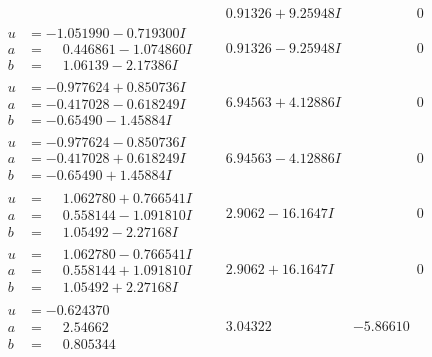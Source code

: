 \documentclass[1p]{elsarticle_modified}
\theoremstyle{definition}
\begin{document}
$$\begin{array}{c|c|c}
 & \phantom{-}0.91326 + 9.25948 I & \phantom{-0.000000 } 0 \\ \hline\begin{aligned}
u &= -1.051990 - 0.719300 I \\
a &= \phantom{-}0.446861 - 1.074860 I \\
b &= \phantom{-}1.06139 - 2.17386 I\end{aligned}
 & \phantom{-}0.91326 - 9.25948 I & \phantom{-0.000000 } 0 \\ \hline\begin{aligned}
u &= -0.977624 + 0.850736 I \\
a &= -0.417028 - 0.618249 I \\
b &= -0.65490 - 1.45884 I\end{aligned}
 & \phantom{-}6.94563 + 4.12886 I & \phantom{-0.000000 } 0 \\ \hline\begin{aligned}
u &= -0.977624 - 0.850736 I \\
a &= -0.417028 + 0.618249 I \\
b &= -0.65490 + 1.45884 I\end{aligned}
 & \phantom{-}6.94563 - 4.12886 I & \phantom{-0.000000 } 0 \\ \hline\begin{aligned}
u &= \phantom{-}1.062780 + 0.766541 I \\
a &= \phantom{-}0.558144 - 1.091810 I \\
b &= \phantom{-}1.05492 - 2.27168 I\end{aligned}
 & \phantom{-}2.9062 - 16.1647 I & \phantom{-0.000000 } 0 \\ \hline\begin{aligned}
u &= \phantom{-}1.062780 - 0.766541 I \\
a &= \phantom{-}0.558144 + 1.091810 I \\
b &= \phantom{-}1.05492 + 2.27168 I\end{aligned}
 & \phantom{-}2.9062 + 16.1647 I & \phantom{-0.000000 } 0 \\ \hline\begin{aligned}
u &= -0.624370\phantom{ +0.000000I} \\
a &= \phantom{-}2.54662\phantom{ +0.000000I} \\
b &= \phantom{-}0.805344\phantom{ +0.000000I}\end{aligned}
 & \phantom{-}3.04322\phantom{ +0.000000I} & -5.86610\phantom{ +0.000000I} \\ \hline\begin{aligned}

\end{aligned}
\end{array}$$
\end{document}
